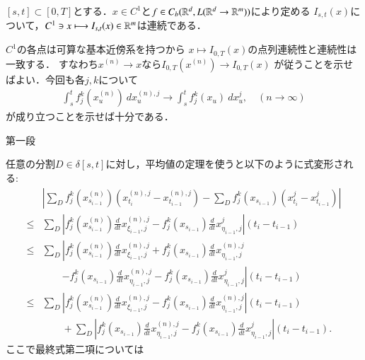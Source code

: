 \begin{screen}
	\begin{thm}
		$[s,t] \subset [0,T]$とする．$x \in C^1$と$f \in C_b(\mathbb{R}^d,L(\mathbb{R}^d \rightarrow \mathbb{R}^m))$により定める
		$I_{s,t}(x)$について，$C^1 \ni x \longmapsto I_{s,t}(x) \in \mathbb{R}^m$は連続である．
	\end{thm}
\end{screen}

\begin{prf}
	$C^1$の各点は可算な基本近傍系を持つから
	$x \longmapsto I_{0,T}(x)$の点列連続性と連続性は一致する．
	すなわち$x^{(n)} \longrightarrow x$なら$I_{0,T}(x^{(n)}) \longrightarrow I_{0,T}(x)$
	が従うことを示せばよい．今回も各$j,k$について
	\begin{align}
		\int_s^t f^k_j(x^{(n)}_u)\ dx^{(n),j}_u
		\longrightarrow \int_s^t f^k_j(x_u)\ dx^j_u,
		\quad (n \longrightarrow \infty)
	\end{align}
	が成り立つことを示せば十分である．
	\begin{description}
		\item[第一段]
	\end{description}
	任意の分割$D \in \delta[s,t]$に対し，平均値の定理を使うと以下のように式変形される:
	\begin{align}
		&\left| \sum_D f^k_j(x^{(n)}_{s_{i-1}})(x^{(n),j}_{t_i} - x^{(n),j}_{t_{i-1}})
			- \sum_D f^k_j(x_{s_{i-1}})(x^j_{t_i} - x^j_{t_{i-1}}) \right| \\
		\leq &\sum_D \left| f^k_j(x^{(n)}_{s_{i-1}}) \tfrac{d}{dt}x^{(n),j}_{\xi_{i-1},j} 
			- f^k_j(x_{s_{i-1}}) \tfrac{d}{dt}x^j_{\eta_{i-1},j} \right|(t_i - t_{i-1}) \\
		\leq &\sum_D \left| f^k_j(x^{(n)}_{s_{i-1}}) \tfrac{d}{dt}x^{(n),j}_{\xi_{i-1},j} 
			+ f^k_j(x_{s_{i-1}}) \tfrac{d}{dt}x^{(n),j}_{\eta_{i-1},j} \right.\\
			&\qquad \left.- f^k_j(x_{s_{i-1}}) \tfrac{d}{dt}x^{(n),j}_{\eta_{i-1},j}
			- f^k_j(x_{s_{i-1}}) \tfrac{d}{dt}x^j_{\eta_{i-1},j} \right|(t_i - t_{i-1}) \\
		\leq &\sum_D \left| f^k_j(x^{(n)}_{s_{i-1}}) \tfrac{d}{dt}x^{(n),j}_{\xi_{i-1},j} 
			- f^k_j(x_{s_{i-1}}) \tfrac{d}{dt}x^{(n),j}_{\eta_{i-1},j} \right|(t_i - t_{i-1}) \\
			&\qquad + \sum_D \left|f^k_j(x_{s_{i-1}}) \tfrac{d}{dt}x^{(n),j}_{\eta_{i-1},j}
			- f^k_j(x_{s_{i-1}}) \tfrac{d}{dt}x^j_{\eta_{i-1},j} \right|(t_i - t_{i-1}).
	\end{align}
	ここで最終式第二項については
	\begin{align}

\end{align}
\end{prf}
